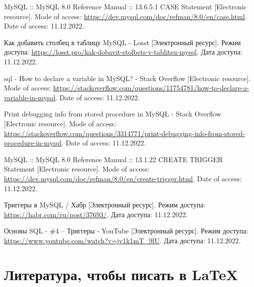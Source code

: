   \begin{thebibliography}{}

    MySQL :: MySQL 8.0 Reference Manual :: 13.6.5.1 CASE Statement
    [Electronic resource].
    Mode of access: \url{https://dev.mysql.com/doc/refman/8.0/en/case.html}.
    Date of access: 11.12.2022.

    Как добавить столбец в таблицу MySQL - Losst
    [Электронный ресурс].
    Режим доступа: \url{https://losst.pro/kak-dobavit-stolbets-v-tablitsu-mysql}.
    Дата доступа: 11.12.2022.

    sql - How to declare a variable in MySQL? - Stack Overflow
    [Electronic resource].
    Mode of access: \url{https://stackoverflow.com/questions/11754781/how-to-declare-a-variable-in-mysql}.
    Date of access: 11.12.2022.

    Print debugging info from stored procedure in MySQL - Stack Overflow
    [Electronic resource].
    Mode of access: \url{https://stackoverflow.com/questions/3314771/print-debugging-info-from-stored-procedure-in-mysql}.
    Date of access: 11.12.2022.

    MySQL :: MySQL 8.0 Reference Manual :: 13.1.22 CREATE TRIGGER Statement
    [Electronic resource].
    Mode of access: \url{https://dev.mysql.com/doc/refman/8.0/en/create-trigger.html}.
    Date of access: 11.12.2022.

    Триггеры в MySQL / Хабр
    [Электронный ресурс].
    Режим доступа: \url{https://habr.com/ru/post/37693/}.
    Дата доступа: 11.12.2022.

    Основы SQL - \#4 – Триггеры - YouTube
    [Электронный ресурс].
    Режим доступа: \url{https://www.youtube.com/watch?v=jv1k1mT_9lU}.
    Дата доступа: 11.12.2022.
  
  \end{thebibliography}
\endgroup

\newpage

\begingroup
  \section*{Литература, чтобы писать в \LaTeX}

  \renewcommand{\addcontentsline}[3]{}%
  \renewcommand{\section}[2]{}%


